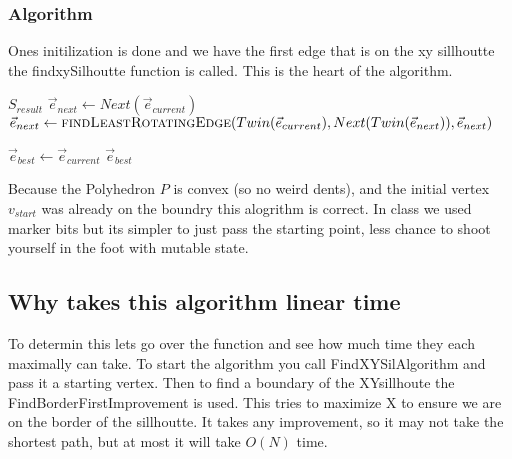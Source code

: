 \documentclass{article}
\begin{document}
\subsubsection{Algorithm}
Ones initilization is done and we have the first edge that is on the xy
sillhoutte the findxySilhoutte function is called.
This is the heart of the algorithm.
\begin{algorithmic}[1]
	\State
		\State \Return $S_{result}$
	\EndIf
	\State
	\State
	$\vec{e}_{next} \gets Next(\vec{e}_{current})$
	\State
	\State
	$\vec{e}_{next} \gets \Call{findLeastRotatingEdge}{Twin(\vec{e}_{current}), Next(Twin(\vec{e}_{next})), \vec{e}_{next}}$
	\State
	\Return {}
	\EndFunction

		\State
		$\vec{e}_{best} \gets \vec{e}_{current}$
	\EndIf
	\State
		\State
		\Return $\vec{e}_{best}$
	\EndIf
	\State
	\Return {}
	\EndFunction
\end{algorithmic}

Because the Polyhedron $P$ is convex (so no weird dents), and
the initial vertex $v_{start}$ was already on the boundry this
alogrithm is correct.
In class we used marker bits but its simpler to just pass the
starting point, less chance to shoot yourself in the foot with
mutable state.

\subsection{Why takes this algorithm linear time}
To determin this lets go over the function and see how much time they each
maximally can take.
To start the algorithm you call FindXYSilAlgorithm and pass it a starting
vertex. Then to find a boundary of the XYsillhoute the
FindBorderFirstImprovement is used. This tries to maximize X to ensure we
are on the border of the sillhoutte. It takes any improvement, so it may
not take the shortest path, but at most it will take $O(N)$ time.
\end{document}
